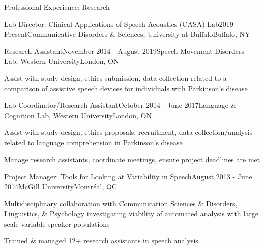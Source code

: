 \documentclass{resume} %
\begin{document}


\begin{rSection}{Professional Experience: Research}

	\begin{rSubsection}{Lab Director: Clinical Applications of Speech Acoustics (CASA) Lab}{2019 --- Present}{Communicative Disorders \& Sciences, University at Buffalo}{Buffalo, NY}
	\end{rSubsection}

	\begin{rSubsection}{Research Assistant}{November 2014 - August 2019}{Speech Movement Disorders Lab, Western University}{London, ON}
	\item Assist with study design, ethics submission, data collection related to a comparison of assistive speech devices for individuals with Parkinson's disease
	\end{rSubsection}
	
	
	\begin{rSubsection}{Lab Coordinator/Research Assistant}{October 2014 - June 2017}{Language \& Cognition Lab, Western University}{London, ON}
	\item Assist with study design, ethics proposals, recruitment, data collection/analysis related to language comprehension in Parkinson's disease
	\item Manage research assistants, coordinate meetings, ensure project deadlines are met
	\end{rSubsection}
	
	
	\begin{rSubsection}{Project Manager: Tools for Looking at Variability in Speech}{August 2013 - June 2014}{McGill University}{Montr\'eal, QC}
	\item Multidisciplinary collaboration with Communication Sciences \& Disorders, Linguistics, \& Psychology investigating viability of automated analysis with large scale variable speaker populations
	\item Trained \& managed 12+ research assistants in speech analysis
	\end{rSubsection}
	

\end{rSection}
\end{document}
